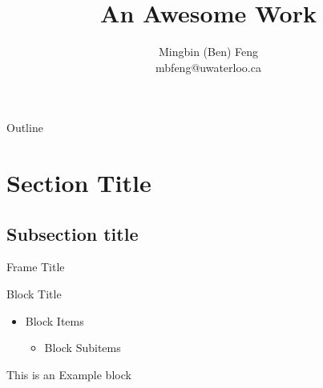 \documentclass[9pt,handout]{beamer}
\title[\textbf{Catch Phrase}]{An Awesome Work} %
\author[\textbf{Ben Feng (ben.feng@uwaterloo.ca)}]
{Mingbin (Ben) Feng\\
mbfeng@uwaterloo.ca} %
\institute[\textbf{University of Waterloo, Actuarial Science}] %
{Dept. Statistics and Actuarial Science\\
University of Waterloo %
}
\begin{document}
{
\beamertemplatenavigationsymbolsempty
\begin{frame}[plain]
\titlepage
\end{frame}
}

{
\beamertemplatenavigationsymbolsempty
{}
{ }
\begin{frame}{Outline} 
\tableofcontents 
\end{frame} 
}
\addtocounter{framenumber}{-2}
\section{Section Title}
\subsection{Subsection title}

\begin{frame}{Frame Title}

\begin{block}{Block Title}
	\begin{itemize}
		\item Block Items
		\begin{itemize}
			\item Block Subitems
		\end{itemize}
	\end{itemize}
\end{block}

\begin{example}
	This is an Example block
\end{example}
\end{frame}




\end{document}
